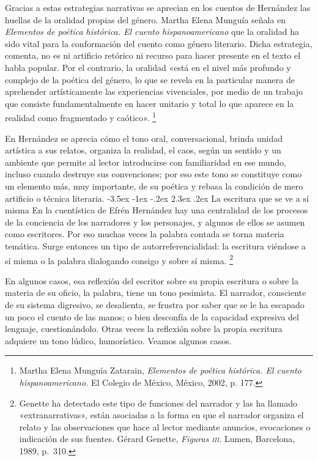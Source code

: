 \documentclass[14pt,twoside,final]{extbook} %
\makeatletter
\let\oldfootnote\footnote
\renewcommand\footnote[1]{%
\oldfootnote{\hspace{1mm}#1}}
\renewcommand\section{\@startsection {section}{1}{\z@}%
                                     {-3.5ex \@plus -1ex \@minus -.2ex}%
                                     {2.3ex \@plus .2ex}%
                                     {\normalfont\large\bfseries\sc}}
\makeatother
\begin{document}
Gracias a estas estrategias narrativas se aprecian en los cuentos de Hernández las huellas de la oralidad propias del género. Martha Elena Munguía señala en \emph{Elementos de poética histórica. El cuento hispanoamericano} que la oralidad ha sido vital para la conformación del cuento como género literario. Dicha estrategia, comenta, no es ni artificio retórico ni recurso para hacer presente en el texto el habla popular. Por el contrario, la oralidad «está en el nivel más profundo y complejo de la poética del género, lo que se revela en la particular manera de aprehender artísticamente las experiencias vivenciales, por medio de un trabajo que consiste fundamentalmente en hacer unitario y total lo que aparece en la realidad como fragmentado y caótico».\footnote{Martha Elena Munguía Zatarain, \emph{Elementos de poética histórica. El cuento hispanoamericano.} El Colegio de México, México, 2002, p. 177.}

En Hernández se aprecia cómo el tono oral, conversacional, brinda unidad artística a sus relatos, organiza la realidad, el caos, según un sentido y un ambiente que permite al lector introducirse con familiaridad en ese mundo, incluso cuando destruye sus convenciones; por eso este tono se constituye como un elemento más, muy importante, de su poética y rebasa la condición de mero artificio o técnica literaria.
\section{La escritura que se ve a sí misma}\label{sec:la-escritura-que-se-ve-a-si-misma}
En la cuentística de Efrén Hernández hay una centralidad de los procesos de la conciencia de los narradores y los personajes, y algunos de ellos se asumen como escritores. Por eso muchas veces la palabra contada se torna materia temática. Surge entonces un tipo de autorreferencialidad: la escritura viéndose a sí misma o la palabra dialogando consigo y sobre sí misma.\footnote{Genette ha detectado este tipo de funciones del narrador y las ha llamado «extranarrativas», están asociadas a la forma en que el narrador organiza el relato y las observaciones que hace al lector mediante anuncios, evocaciones o indicación de sus fuentes. Gérard Genette, \emph{Figuras \textsc{iii}.} Lumen, Barcelona, 1989, p.~310.}

En algunos casos, esa reflexión del escritor sobre su propia escritura o sobre la materia de su oficio, la palabra, tiene un tono pesimista. El narrador, consciente de su sistema digresivo, se desalienta, se frustra por saber que se le ha escapado un poco el cuento de las manos; o bien desconfía de la capacidad expresiva del lenguaje, cuestionándolo. Otras veces la reflexión sobre la propia escritura adquiere un tono lúdico, humorístico. Veamos algunos casos.
\end{document}
